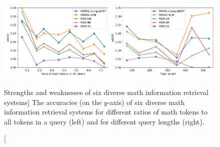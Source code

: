 \begin{figure}
\vspace*{-0.25cm}
\hspace*{-0.025\columnwidth}
\includegraphics[width=1.025\columnwidth]{strengths-and-weaknesses}
\vspace*{-0.8cm}
\caption
  [Strengths and weaknesses of six diverse math information retrieval systems]%
  {The accuracies (on the $y$-axis) of six diverse math information retrieval 
   systems for different ratios of math tokens to all tokens in a query (left)
   and for different query lengths (right). \cite[Figure 8]{novotny2021ensembling}}
\label{fig:strengths-and-weaknesses}
\end{figure}
